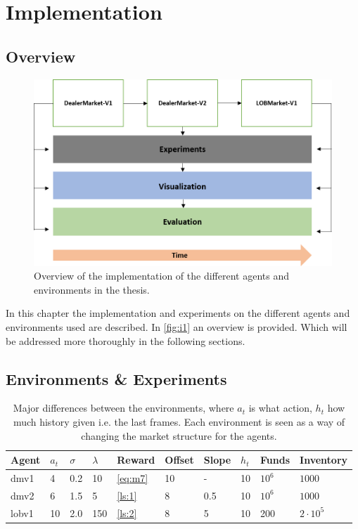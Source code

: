 \documentclass{kththesis}
\theoremstyle{definition}
\begin{document}
\chapter{Implementation}\label{ch:5}

\section{Overview}
\begin{figure}[H]
    \centering
    \includegraphics[scale=.7]{Imgs/implementation.png}
    \caption{Overview of the implementation of the different agents and environments in the thesis.}
    \label{fig:i1}
\end{figure}
In this chapter the implementation and experiments on the different agents and environments used are described. In \autoref{fig:i1} an overview is provided. Which will be addressed more thoroughly in the following sections.

\section{Environments \& Experiments}

\begin{table}[H]
\centering
\caption{Major differences between the environments, where $a_t$ is what action, $h_t$ how much history given i.e. the last frames. Each environment is seen as a way of changing the market structure for the agents.}
\label{tab:e11}
\begin{tabular}{llllllllll}
Agent & $a_t$  & $\sigma$  & $\lambda$  & Reward  & Offset  & Slope  & $h_t$  & Funds & Inventory  \\ \hline
 dmv1 & 4  & 0.2  & 10  & \autoref{eq:m7}  & 10  & -  &  10 & $10^6$ & $1000$ \\
 dmv2 & 6  & 1.5  & 5  & \autoref{ls:1}  & 8  & 0.5  & 10  & $10^6$ & $1000$ \\
 lobv1& 10 & 2.0  & 150  & \autoref{ls:2} & 8  & 5  & 10  & 200 & $2\cdot 10^5$
\end{tabular}
\end{table}
\end{document}
